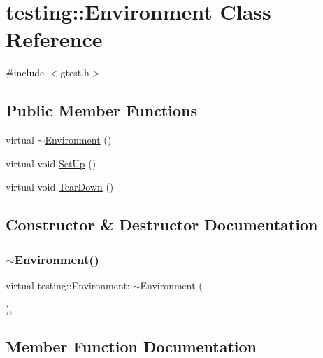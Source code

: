 \hypertarget{classtesting_1_1_environment}{}\section{testing\+::Environment Class Reference}
\label{classtesting_1_1_environment}


{\ttfamily \#include $<$gtest.\+h$>$}

\subsection*{Public Member Functions}
\begin{DoxyCompactItemize}
\item 
virtual \mbox{\hyperlink{classtesting_1_1_environment_a0e41c320362576d752cd1f44cabd57d4}{$\sim$\+Environment}} ()
\item 
virtual void \mbox{\hyperlink{classtesting_1_1_environment_a1bf8cafaa9d4eba9feb98655ee434eb3}{Set\+Up}} ()
\item 
virtual void \mbox{\hyperlink{classtesting_1_1_environment_a039bdaa705c46b9b88234cf4d3bb6254}{Tear\+Down}} ()
\end{DoxyCompactItemize}


\subsection{Constructor \& Destructor Documentation}
\mbox{\label{classtesting_1_1_environment_a0e41c320362576d752cd1f44cabd57d4}} 
\subsubsection{\texorpdfstring{$\sim$Environment()}{~Environment()}}
{\footnotesize\ttfamily virtual testing\+::\+Environment\+::$\sim$\+Environment (\begin{DoxyParamCaption}{ }\end{DoxyParamCaption})\hspace{0.3cm}{\ttfamily [inline]}, {\ttfamily [virtual]}}



\subsection{Member Function Documentation}
\mbox{\label{classtesting_1_1_environment_a1bf8cafaa9d4eba9feb98655ee434eb3}} 
